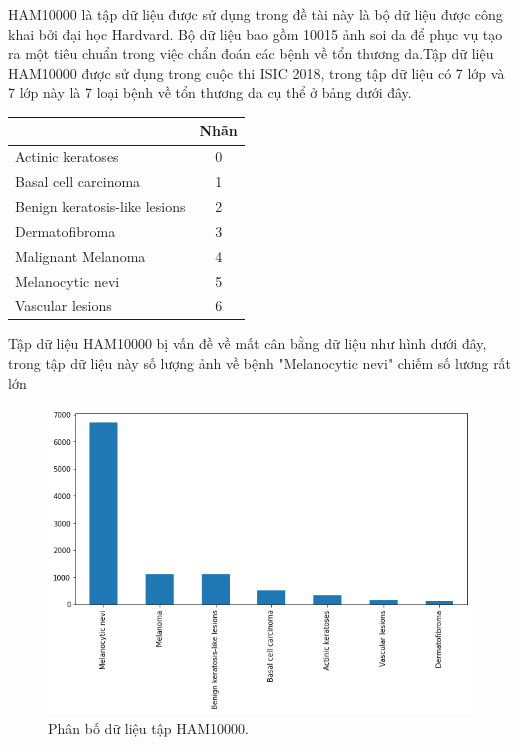 \documentclass[12pt,a4paper]{article}
\begin{document}
	HAM10000 là tập dữ liệu được sử dụng trong đề tài này là bộ dữ liệu được công khai bởi đại học Hardvard. Bộ dữ liệu bao gồm 10015 ảnh soi da để phục vụ tạo ra một tiêu chuẩn trong việc chẩn đoán các bệnh về tổn thương da.Tập dữ liệu HAM10000 được sử dụng trong cuộc thi ISIC 2018, trong tập dữ liệu có 7 lớp và 7 lớp này là 7 loại bệnh về tổn thương da cụ thể ở bảng dưới đây.
	
	\begin{center}
		\begin{tabular}{|l|c|}
			\hline
			\rowcolor[HTML]{333333} 
			\multicolumn{1}{|c|}{\cellcolor[HTML]{333333}{\color[HTML]{FFFFFF} \textbf{Loại bệnh}}} & {\color[HTML]{FFFFFF} \textbf{Nhãn}} \\ \hline
			Actinic keratoses                                                                       & 0                                    \\ \hline
			Basal cell carcinoma                                                                    & 1                                    \\ \hline
			Benign keratosis-like lesions                                                           & 2                                    \\ \hline
			Dermatofibroma                                                                          & 3                                    \\ \hline
			Malignant Melanoma                                                                      & 4                                    \\ \hline
			Melanocytic nevi                                                                        & 5                                    \\ \hline
			Vascular lesions                                                                        & 6                                    \\ \hline
		\end{tabular}
	\end{center}

	\noindent
	Tập dữ liệu HAM10000 bị vấn đề về mất cân bằng dữ liệu như hình dưới đây, trong tập dữ liệu này số lượng ảnh về bệnh "Melanocytic nevi" chiếm số lương rất lớn\\	
	
	
	\begin{figure}[h!]
		\centering
		\includegraphics[width=0.5\linewidth]{./images/imbalance.png}
		\caption{Phân bố dữ liệu tập HAM10000.}
		\label{fig:ham10000}
	\end{figure}
\end{document}
